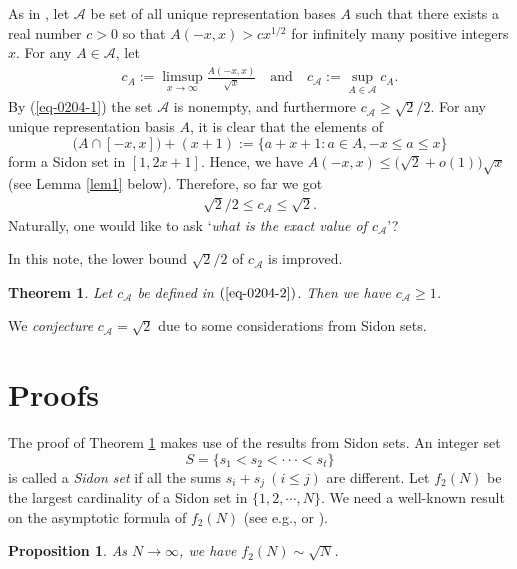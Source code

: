 \documentclass[12pt,a4paper,reqno]{amsart}
\numberwithin{equation}{section}
\theoremstyle{plain}
\newtheorem{theorem}{Theorem}
\newtheorem{proposition}{Proposition}
\theoremstyle{definition}
\begin{document}
As in \cite{Ding}, let $\mathscr{A}$ be set of all unique representation bases $A$ such that there exists a real number $c>0$ so that $A(-x,x)>c x^{1/2}$ for infinitely many positive integers $x$. For any $A\in \mathscr{A}$, let 
\begin{align}\label{eq-0204-2}
c_A:=\limsup_{x\rightarrow\infty}\frac{A(-x,x)}{\sqrt{x}} \quad \text{and} \quad c_{\mathscr{A}}:=\sup_{A\in \mathscr{A}}c_A.
\end{align}
By (\ref{eq-0204-1}) the set $\mathscr{A}$ is nonempty, and furthermore
$
c_{\mathscr{A}}\ge \sqrt{2}/2.
$ 
For any unique representation basis $A$, it is clear that the elements of 
$$
\big(A\cap[-x, x]\big)+(x+1):=\{a+x+1: a\in A, -x\le a\le x\}
$$
form a Sidon set in $[1, 2x+1]$. Hence, we have $A(-x,x)\le \big(\sqrt{2}+o(1)\big)\sqrt{x}$ (see Lemma \ref{lem1} below). Therefore, so far we got
\begin{align*}
\sqrt{2}/2\le c_{\mathscr{A}}\le \sqrt{2}.
\end{align*}
Naturally, one would like to ask `{\it what is the exact value of $c_{\mathscr{A}}$}'? 

In this note, the lower bound $\sqrt{2}/2$ of $c_{\mathscr{A}}$ is improved.

\begin{theorem}\label{thm:1}
Let $c_{\mathscr{A}}$ be defined in $(\ref{eq-0204-2})$. Then we have $c_{\mathscr{A}}\ge 1$.
\end{theorem}

We {\it conjecture} $c_{\mathscr{A}}=\sqrt{2}$ due to some considerations from Sidon sets. 

\section{Proofs}
The proof of Theorem \ref{thm:1} makes use of the results from Sidon sets. 
An integer set 
$$
S=\{s_1<s_2<\cdot\cdot\cdot<s_t\}
$$ 
is called a {\it Sidon set} if all the sums 
$
s_i+s_j~(i\le j)
$
are different. Let $f_2(N)$ be the largest cardinality of a Sidon set in $\big\{1,2,\cdots, N\big\}$.
We need a well-known result on the asymptotic formula of $f_2(N)$ (see e.g., \cite[Theorem 7, page 88]{Sidon} or \cite{O'}).
\begin{proposition}\label{prop1}
As $N\rightarrow\infty$, we have $f_2(N)\sim \sqrt{N}$.
\end{proposition}
\end{document}
